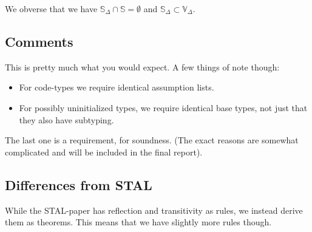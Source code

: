 We obverse that we have $\mathbb{S}_\Delta \cap \mathbb{S} = \emptyset$ and
$\mathbb{S}_\Delta \subset \mathbb{V}_\Delta$.

\subsection{Comments}
This is pretty much what you would expect. A few things of note though:

\begin{itemize}
\item For code-types we require identical assumption lists.
\item For possibly uninitialized types, we require identical base types, not
  just that they also have subtyping.
\end{itemize}

The last one is a requirement, for soundness. (The exact reasons are somewhat complicated and will be included in the final report).

\subsection{Differences from STAL}
While the STAL-paper has reflection and transitivity as rules, we instead derive
them as theorems. This means that we have slightly more rules though.
